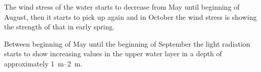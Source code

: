 \documentclass[../Main.tex]{subfiles}
\begin{document}
The wind stress of the water starts to decrease from May until beginning of August, then it starts to pick up again and in October the wind stress is showing the strength of that in early spring. 

Between beginning of May until the beginning of September the light radiation starts to show increasing values in the upper water layer in a depth of approximately \SIrange{1}{2}{\metre}.
\end{document}
